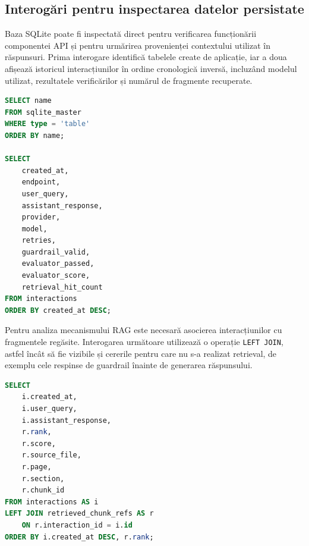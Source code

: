 \documentclass[12pt, a4paper, oneside, romanian]{teza-upb}
\begin{document}
\subsection{Interogări pentru inspectarea datelor persistate}

Baza SQLite poate fi inspectată direct pentru verificarea funcționării componentei API și pentru urmărirea provenienței contextului utilizat în răspunsuri. Prima interogare identifică tabelele create de aplicație, iar a doua afișează istoricul interacțiunilor în ordine cronologică inversă, incluzând modelul utilizat, rezultatele verificărilor și numărul de fragmente recuperate.
\renewcommand{\lstlistingname}{Cod}
\begin{center}
\begin{minipage}{0.64\textwidth}
\begin{lstlisting}[language=SQL, caption={Listarea tabelelor și inspectarea interacțiunilor persistate}]
SELECT name
FROM sqlite_master
WHERE type = 'table'
ORDER BY name;

SELECT
    created_at,
    endpoint,
    user_query,
    assistant_response,
    provider,
    model,
    retries,
    guardrail_valid,
    evaluator_passed,
    evaluator_score,
    retrieval_hit_count
FROM interactions
ORDER BY created_at DESC;
\end{lstlisting}
\end{minipage}
\end{center}

Pentru analiza mecanismului RAG este necesară asocierea interacțiunilor cu fragmentele regăsite. Interogarea următoare utilizează o operație \texttt{LEFT JOIN}, astfel încât să fie vizibile și cererile pentru care nu s-a realizat retrieval, de exemplu cele respinse de guardrail înainte de generarea răspunsului.

\begin{center}
\begin{minipage}{0.68\textwidth}
\begin{lstlisting}[language=SQL, caption={Asocierea răspunsurilor cu sursele recuperate}]
SELECT
    i.created_at,
    i.user_query,
    i.assistant_response,
    r.rank,
    r.score,
    r.source_file,
    r.page,
    r.section,
    r.chunk_id
FROM interactions AS i
LEFT JOIN retrieved_chunk_refs AS r
    ON r.interaction_id = i.id
ORDER BY i.created_at DESC, r.rank;
\end{lstlisting}
\end{minipage}
\end{center}
\end{document}

